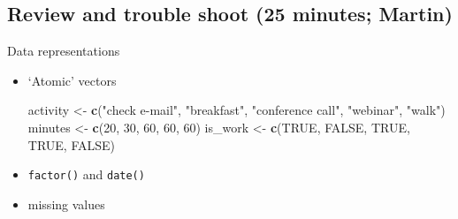 \documentclass[]{book}
\newenvironment{Shaded}{\begin{snugshade}}{\end{snugshade}}
\newcommand{\DataTypeTok}[1]{\textcolor[rgb]{0.13,0.29,0.53}{#1}}
\newcommand{\DecValTok}[1]{\textcolor[rgb]{0.00,0.00,0.81}{#1}}
\newcommand{\KeywordTok}[1]{\textcolor[rgb]{0.13,0.29,0.53}{\textbf{#1}}}
\newcommand{\NormalTok}[1]{#1}
\newcommand{\OtherTok}[1]{\textcolor[rgb]{0.56,0.35,0.01}{#1}}
\newcommand{\StringTok}[1]{\textcolor[rgb]{0.31,0.60,0.02}{#1}}
\begin{document}
\hypertarget{review-and-trouble-shoot-25-minutes-martin}{%
\subsection{Review and trouble shoot (25 minutes; Martin)}\label{review-and-trouble-shoot-25-minutes-martin}}

Data representations

\begin{itemize}
\item
  `Atomic' vectors

\begin{Shaded}
\begin{Highlighting}[]
\NormalTok{activity <-}\StringTok{ }\KeywordTok{c}\NormalTok{(}\StringTok{"check e-mail"}\NormalTok{, }\StringTok{"breakfast"}\NormalTok{, }\StringTok{"conference call"}\NormalTok{, }\StringTok{"webinar"}\NormalTok{, }\StringTok{"walk"}\NormalTok{)}
\NormalTok{minutes <-}\StringTok{ }\KeywordTok{c}\NormalTok{(}\DecValTok{20}\NormalTok{, }\DecValTok{30}\NormalTok{, }\DecValTok{60}\NormalTok{, }\DecValTok{60}\NormalTok{, }\DecValTok{60}\NormalTok{)}
\NormalTok{is_work <-}\StringTok{ }\KeywordTok{c}\NormalTok{(}\OtherTok{TRUE}\NormalTok{, }\OtherTok{FALSE}\NormalTok{, }\OtherTok{TRUE}\NormalTok{, }\OtherTok{TRUE}\NormalTok{, }\OtherTok{FALSE}\NormalTok{)}
\end{Highlighting}
\end{Shaded}
\item
  \texttt{factor()} and \texttt{date()}

\begin{Shaded}
\end{Shaded}
\item
  missing values


\end{itemize}
\end{document}
